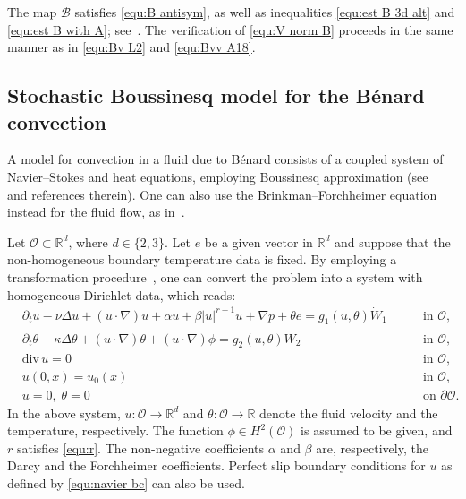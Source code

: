 \documentclass[11pt, reqno]{amsart}
\theoremstyle{definition}
\numberwithin{equation}{section}
\newcommand{\bb}{\mathbb}
\newcommand{\divg}{\mathrm{div}\,}
\begin{document}
The map $\mathcal{B}$ satisfies \eqref{equ:B antisym}, as well as inequalities \eqref{equ:est B 3d alt} and \eqref{equ:est B with A}; see~\cite{Mot22}. The verification of \eqref{equ:V norm B} proceeds in the same manner as in \eqref{equ:Bv L2} and \eqref{equ:Bvv A18}.





\subsection{Stochastic Boussinesq model for the B\'enard convection}\label{sec:sbc}

A model for convection in a fluid due to B\'enard consists of a coupled system of Navier--Stokes and heat equations, employing Boussinesq approximation (see~\cite{AgrBerSat15, FoiManTem87, GalPad90} and references therein). One can also use the Brinkman--Forchheimer equation instead for the fluid flow, as in~\cite{AmiLepOta25, SaySemTri21, TitTra24}. 

Let $\mathscr{O}\subset\bb{R}^d$, where $d\in \{2,3\}$. Let $e$ be a given vector in $\bb{R}^d$ and suppose that the non-homogeneous boundary temperature data is fixed. By employing a transformation procedure~\cite{His91}, one can convert the problem into a system with homogeneous Dirichlet data, which reads:
\begin{subequations}\label{equ:sbc}
	\begin{alignat}{2}
		&\partial_t u - \nu \Delta u + (u\cdot\nabla)u + \alpha u +\beta |u|^{r-1} u + \nabla p + \theta e = g_1(u,\theta)\dot{W}_1
		\; && \quad\text{in $\mathscr{O}$,}
		\label{equ:sbc a1}
		\\[1ex]
        \label{equ:sbc a2}
        &\partial_t \theta - \kappa \Delta \theta + (u\cdot\nabla)\theta + (u\cdot\nabla)\phi = g_2(u,\theta) \dot{W}_2
        \; && \quad\text{in $\mathscr{O}$,}
        \\[1ex]
		&\divg u = 0
		\; && \quad\text{in $\mathscr{O}$,}
		\label{equ:sbc b}
		\\[1ex]
		&u(0,x)= u_0(x) 
		\; && \quad\text{in $\mathscr{O}$,}
		\label{equ:sbc c}
		\\[1ex]
		&u = 0, \; \theta=0
		\; && \quad\text{on $\partial\mathscr{O}$.}
		\label{equ:sbc d}
	\end{alignat}
\end{subequations}
In the above system, $u:\mathscr{O}\to \bb{R}^d$ and $\theta:\mathscr{O}\to \bb{R}$ denote the fluid velocity and the temperature, respectively. The function $\phi\in H^2(\mathscr{O})$ is assumed to be given, and $r$ satisfies \eqref{equ:r}. The non-negative coefficients $\alpha$ and $\beta$ are, respectively, the Darcy and the Forchheimer coefficients. Perfect slip boundary conditions for $u$ as defined by \eqref{equ:navier bc} can also be used.
\end{document}
